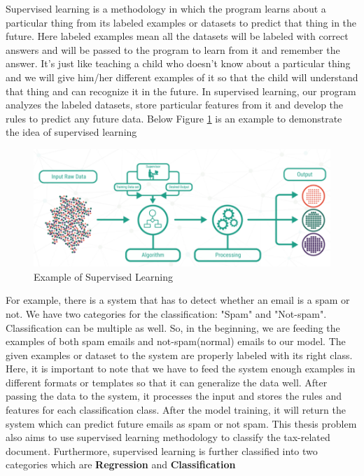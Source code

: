 Supervised learning is a methodology in which the program learns about a particular thing from its labeled examples or datasets to predict that thing in the future. Here labeled examples mean all the datasets will be labeled with correct answers and will be passed to the program to learn from it and remember the answer. It's just like teaching a child who doesn't know about a particular thing and we will give him/her different examples of it so that the child will understand that thing and can recognize it in the future. In supervised learning, our program analyzes the labeled datasets, store particular features from it and develop the rules to predict any future data. Below Figure \ref{ex-sl} is an example to demonstrate the idea of supervised learning
\begin{figure}[H]
\centering
\includegraphics[scale=0.8]{images/Chapter2/supervised-learning-2.PNG}
\caption{Example of Supervised Learning \cite{sup_unsup_learning}}
\label{ex-sl}
\end{figure}
\par
For example, there is a system that has to detect whether an email is a spam or not. We have two categories for the classification: "Spam" and "Not-spam". Classification can be multiple as well. So, in the beginning, we are feeding the examples of both spam emails and not-spam(normal) emails to our model. The given examples or dataset to the system are properly labeled with its right class. Here, it is important to note that we have to feed the system enough examples in different formats or templates so that it can generalize the data well. After passing the data to the system, it processes the input and stores the rules and features for each classification class. After the model training, it will return the system which can predict future emails as spam or not spam. This thesis problem also aims to use supervised learning methodology to classify the tax-related document. 
\newline
\newline
Furthermore, supervised learning is further classified into two categories which are \textbf{Regression} and \textbf{Classification}
